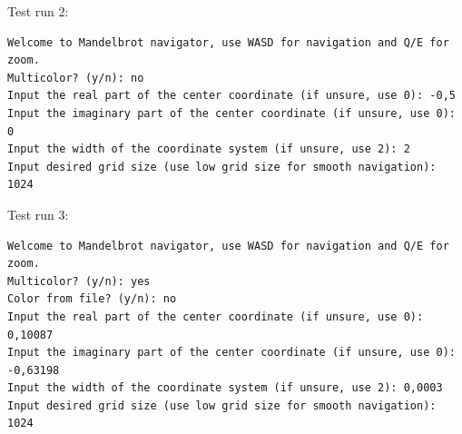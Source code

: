 Test run 2:
\begin{Verbatim}
Welcome to Mandelbrot navigator, use WASD for navigation and Q/E for zoom.
Multicolor? (y/n): no
Input the real part of the center coordinate (if unsure, use 0): -0,5
Input the imaginary part of the center coordinate (if unsure, use 0): 0
Input the width of the coordinate system (if unsure, use 2): 2
Input desired grid size (use low grid size for smooth navigation): 1024
\end{Verbatim}

Test run 3:
\begin{Verbatim}
Welcome to Mandelbrot navigator, use WASD for navigation and Q/E for zoom.
Multicolor? (y/n): yes
Color from file? (y/n): no
Input the real part of the center coordinate (if unsure, use 0): 0,10087
Input the imaginary part of the center coordinate (if unsure, use 0): -0,63198
Input the width of the coordinate system (if unsure, use 2): 0,0003
Input desired grid size (use low grid size for smooth navigation): 1024
\end{Verbatim}



